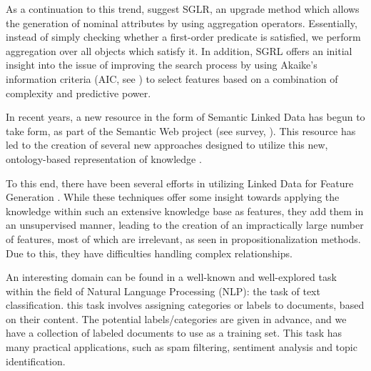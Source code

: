 \documentclass{article}
\theoremstyle{definition}
\begin{document}
As a continuation to this trend, \citet{popescul200716} suggest SGLR, an upgrade method which allows the generation of nominal attributes by using aggregation operators. Essentially, instead of simply checking whether a first-order predicate is satisfied, we perform aggregation over all objects which satisfy it. In addition, SGRL offers an initial insight into the issue of improving the search process by using Akaike's information criteria (AIC, see \citet{burnham2002model}) to select features based on a combination of complexity and predictive power. 


In recent years, a new resource in the form of Semantic Linked Data has begun to take form, as part of the Semantic Web project (see survey, \citet{bizer2009linked}). This resource has led to the creation of several new approaches designed to utilize this new, ontology-based representation of knowledge \citep{losch2012graph,rios2014statistical}.

To this end, there have been several efforts in utilizing Linked Data for Feature Generation \citep{cheng2011automated, paulheim2012unsupervised}. While these techniques offer some insight towards applying the knowledge within such an extensive knowledge base as features, they add them in an unsupervised manner, leading to the creation of an impractically large number of features, most of which are irrelevant, as seen in propositionalization methods. Due to this, they have difficulties handling complex relationships.

An interesting domain can be found in a well-known and well-explored task within the field of Natural Language Processing (NLP): the task of text classification.
this task involves assigning categories or labels to documents, based on their content. The potential labels/categories are given in advance, and we have a collection of labeled documents to use as a training set. This task has many practical applications, such as spam filtering, sentiment analysis and topic identification.
\end{document}
